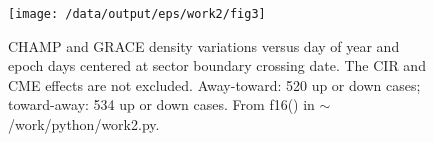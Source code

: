 \documentclass[12pt,a4paper]{article}
\begin{document}
\begin{figure}[!ht]
    \begin{center}
        \texttt{[image: /data/output/eps/work2/fig3]}
        \caption{CHAMP and GRACE density variations versus day of year and epoch days centered at sector boundary crossing date. The CIR and CME effects are not excluded. Away-toward: 520 up or down cases; toward-away: 534 up or down cases. From f16() in $\sim$/work/python/work2.py. }
    \end{center}
    \label{fig3}
\end{figure}
\end{document}
